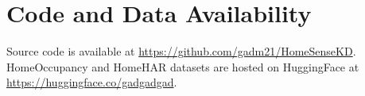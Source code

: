 \documentclass[conference]{IEEEtran}
\begin{document}
\section*{Code and Data Availability}

Source code is available at
\url{https://github.com/gadm21/HomeSenseKD}.
HomeOccupancy and HomeHAR datasets are hosted on HuggingFace at
\url{https://huggingface.co/gadgadgad}.



\end{document}
